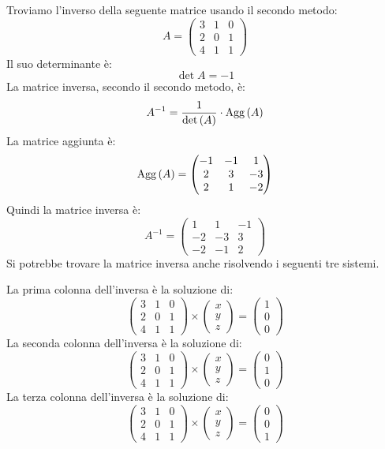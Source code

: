 \begin{exmp}
Troviamo l'inverso della seguente matrice usando il secondo metodo:
\[
A =
\begin{pmatrix}
3 & 1 & 0 \\
2 & 0 & 1 \\
4 & 1 & 1
\end{pmatrix}
\]
Il suo determinante \`e:
\[
\det{A} = -1
\]
La matrice inversa, secondo il secondo metodo, \`e:
\[
A^{-1} = \frac{1}{\operatorname{det} \left({A}\right)} \cdot \operatorname{Agg} \left( {A} \right)
\]
La matrice aggiunta \`e:
\[
\operatorname{Agg} \left( {A} \right) = 
\begin{pmatrix}
-1 & -1 & 1 \\
2 & 3 & -3 \\
2 & 1 & -2
\end{pmatrix}
\]
Quindi la matrice inversa \`e:
\[
A^{-1} =
\begin{pmatrix}
1 & 1 & -1 \\
-2 & -3 & 3 \\
-2 & -1 & 2
\end{pmatrix}
\]
Si potrebbe trovare la matrice inversa anche risolvendo i seguenti tre sistemi.

La prima colonna dell'inversa \`e la soluzione di:
\[
\begin{pmatrix}
3 & 1 & 0 \\
2 & 0 & 1 \\
4 & 1 & 1
\end{pmatrix}
\times
\begin{pmatrix}
x \\ y \\ z
\end{pmatrix}
= 
\begin{pmatrix}
1 \\ 0 \\ 0
\end{pmatrix}
\]
La seconda colonna dell'inversa \`e la soluzione di:
\[
\begin{pmatrix}
3 & 1 & 0 \\
2 & 0 & 1 \\
4 & 1 & 1
\end{pmatrix}
\times
\begin{pmatrix}
x \\ y \\ z
\end{pmatrix}
= 
\begin{pmatrix}
0 \\ 1 \\ 0
\end{pmatrix}
\]
La terza colonna dell'inversa \`e la soluzione di:
\[
\begin{pmatrix}
3 & 1 & 0 \\
2 & 0 & 1 \\
4 & 1 & 1
\end{pmatrix}
\times
\begin{pmatrix}
x \\ y \\ z
\end{pmatrix}
= 
\begin{pmatrix}
0 \\ 0 \\ 1
\end{pmatrix}
\]
\end{exmp}

